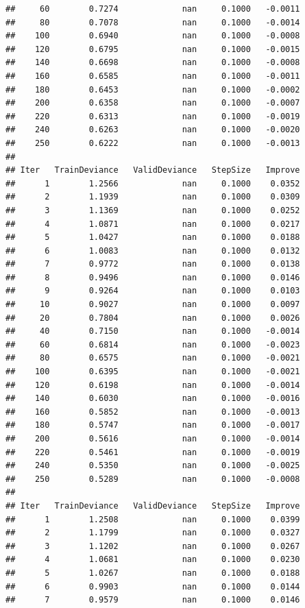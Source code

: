 \documentclass[]{book}
\begin{document}
\begin{verbatim}
##     60        0.7274             nan     0.1000   -0.0011
##     80        0.7078             nan     0.1000   -0.0014
##    100        0.6940             nan     0.1000   -0.0008
##    120        0.6795             nan     0.1000   -0.0015
##    140        0.6698             nan     0.1000   -0.0008
##    160        0.6585             nan     0.1000   -0.0011
##    180        0.6453             nan     0.1000   -0.0002
##    200        0.6358             nan     0.1000   -0.0007
##    220        0.6313             nan     0.1000   -0.0019
##    240        0.6263             nan     0.1000   -0.0020
##    250        0.6222             nan     0.1000   -0.0013
## 
## Iter   TrainDeviance   ValidDeviance   StepSize   Improve
##      1        1.2566             nan     0.1000    0.0352
##      2        1.1939             nan     0.1000    0.0309
##      3        1.1369             nan     0.1000    0.0252
##      4        1.0871             nan     0.1000    0.0217
##      5        1.0427             nan     0.1000    0.0188
##      6        1.0083             nan     0.1000    0.0132
##      7        0.9772             nan     0.1000    0.0138
##      8        0.9496             nan     0.1000    0.0146
##      9        0.9264             nan     0.1000    0.0103
##     10        0.9027             nan     0.1000    0.0097
##     20        0.7804             nan     0.1000    0.0026
##     40        0.7150             nan     0.1000   -0.0014
##     60        0.6814             nan     0.1000   -0.0023
##     80        0.6575             nan     0.1000   -0.0021
##    100        0.6395             nan     0.1000   -0.0021
##    120        0.6198             nan     0.1000   -0.0014
##    140        0.6030             nan     0.1000   -0.0016
##    160        0.5852             nan     0.1000   -0.0013
##    180        0.5747             nan     0.1000   -0.0017
##    200        0.5616             nan     0.1000   -0.0014
##    220        0.5461             nan     0.1000   -0.0019
##    240        0.5350             nan     0.1000   -0.0025
##    250        0.5289             nan     0.1000   -0.0008
## 
## Iter   TrainDeviance   ValidDeviance   StepSize   Improve
##      1        1.2508             nan     0.1000    0.0399
##      2        1.1799             nan     0.1000    0.0327
##      3        1.1202             nan     0.1000    0.0267
##      4        1.0681             nan     0.1000    0.0230
##      5        1.0267             nan     0.1000    0.0188
##      6        0.9903             nan     0.1000    0.0144
##      7        0.9579             nan     0.1000    0.0146

\end{verbatim}
\end{document}

